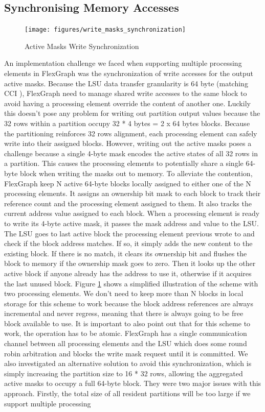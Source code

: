 \subsection{Synchronising Memory Accesses}

\begin{figure}[htbp]
\centering
\texttt{[image: figures/write\_masks\_synchronization]}
\caption{Active Masks Write Synchronization}
\label{fig:write_masks_synchronization}
\end{figure}

An implementation challenge we faced when supporting multiple processing elements in FlexGraph was the synchronization of write accesses for the output active masks. Because the LSU data transfer granularity is 64 byte (matching CCI \cite{CCI}), FlexGraph need to manage shared write accesses to the same block to avoid having a processing element override the content of another one. Luckily this doesn't pose any problem for writing out partition output values because the 32 rows within a partition occupy 32 * 4 bytes = 2 x 64 bytes blocks. Because the partitioning reinforces 32 rows alignment, each processing element can safely write into their assigned blocks. However, writing out the active masks poses a challenge because a single 4-byte mask encodes the active states of all 32 rows in a partition. This causes the processing elements to potentially share a single 64-byte block when writing the masks out to memory. To alleviate the contention, FlexGraph keep N active 64-byte blocks locally assigned to either one of the N processing elements. It assigns an ownership bit mask to each block to track their reference count and the processing element assigned to them. It also tracks the current address value assigned to each block. When a processing element is ready to write its 4-byte active mask, it passes the mask address and value to the LSU. The LSU goes to last active block the processing element previous wrote to and check if the block address matches. If so, it simply adds the new content to the existing block. If there is no match, it clears its ownership bit and flushes the block to memory if the ownership mask goes to zero. Then it looks up the other active block if anyone already has the address to use it, otherwise if it acquires the last unused block. Figure \ref{fig:write_masks_synchronization} shows a simplified illustration of the scheme with two processing elements. We don't need to keep more than N blocks in local storage for this scheme to work because the block address references are always incremental and never regress, meaning that there is always going to be free block available to use. It is important to also point out that for this scheme to work, the operation has to be atomic. FlexGraph has a single communication channel between all processing elements and the LSU which does some round robin arbitration and blocks the write mask request until it is committed. We also investigated an alternative solution to avoid this synchronization, which is simply increasing the partition size to 16 * 32 rows, allowing the aggregated active masks to occupy a full 64-byte block. They were two major issues with this approach. Firstly, the total size of all resident partitions will be too large if we support multiple processing 